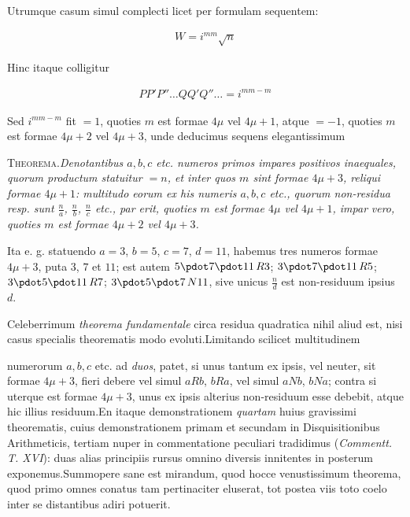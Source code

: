 Utrumque casum simul complecti licet per formulam sequentem:

\[
\begin{aligned}
W=i^{mm}\surd n
\end{aligned}
\]

Hinc itaque colligitur

\[
\begin{aligned}
PP'P''\ldots QQ'Q''\ldots=i^{mm-m}
\end{aligned}
\]

Sed $i^{mm-m}$ fit $=1$, quoties $m$ est formae $4\mu$ vel $4\mu+1$, atque $=-1$, quoties $m$ est formae $4\mu+2$ vel $4\mu+3$, unde deducimus sequens elegantissimum

\textsc{Theorema.}\quad \textit{Denotantibus $a,b,c$ etc. numeros primos impares positivos inae}\textit{quales, quorum productum statuitur $=n$, et inter quos $m$ sint formae $4\mu+3$, re}\textit{liqui formae $4\mu+1$: multitudo eorum ex his numeris $a,b,c$ etc., quorum non-resi}\textit{dua resp. sunt $\frac{n}{a}$, $\frac{n}{b}$, $\frac{n}{c}$ etc., par erit, quoties $m$ est formae $4\mu$ vel $4\mu+1$, impar} \textit{vero, quoties $m$ est formae $4\mu+2$ vel $4\mu+3$.}

Ita e. g. statuendo $a=3$, $b=5$, $c=7$, $d=11$, habemus tres numeros formae $4\mu+3$, puta $3$, $7$ et $11$; est autem $5\pdot7\pdot11\,R3$; $3\pdot7\pdot11\,R5$; $3\pdot5\pdot11\,R7$; $3\pdot5\pdot7\,N11$, sive unicus $\frac{n}{d}$ est non-residuum ipsius $d$.


Celeberrimum \textit{theorema fundamentale} circa residua quadratica nihil aliud est, nisi casus specialis theorematis modo evoluti.\quad Limitando scilicet multitudinem

numerorum $a,b,c$ etc. ad \textit{duos}, patet, si unus tantum ex ipsis, vel neuter, sit formae $4\mu+3$, fieri debere vel simul $aRb$, $bRa$, vel simul $aNb$, $bNa$; contra si uterque est formae $4\mu+3$, unus ex ipsis alterius non-residuum esse debebit, atque hic illius residuum.\quad En itaque demonstrationem \textit{quartam} huius gravissimi theorematis, cuius demonstrationem primam et secundam in Disquisitionibus Arithmeticis, tertiam nuper in commentatione peculiari tradidimus (\textit{Commentt. T. XVI}): duas alias principiis rursus omnino diversis innitentes in posterum exponemus.\quad Summopere sane est mirandum, quod hocce venustissimum theorema, quod primo omnes conatus tam pertinaciter eluserat, tot postea viis toto coelo inter se distantibus adiri potuerit.

